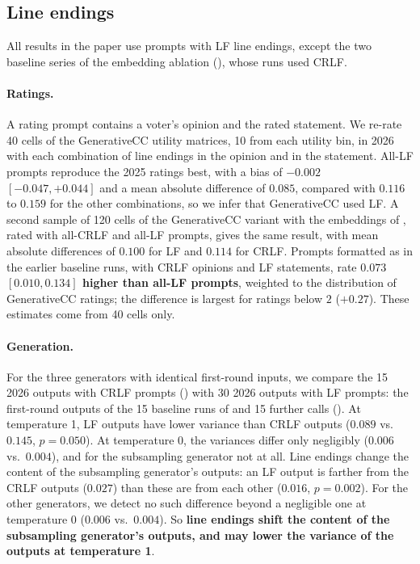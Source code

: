 \documentclass[letterpaper]{article} %
\begin{document}
\subsection{Line endings}
\label{app:line-endings}

All results in the paper use prompts with LF line endings, except the two baseline series of the embedding ablation (), whose runs used CRLF.

\paragraph{Ratings.}
A rating prompt contains a voter's opinion and the rated statement.
We re-rate 40 cells of the GenerativeCC utility matrices, 10 from each utility bin, in 2026 with each combination of line endings in the opinion and in the statement.
All-LF prompts reproduce the 2025 ratings best, with a bias of \(-0.002\) \([-0.047, +0.044]\) and a mean absolute difference of \(0.085\), compared with \(0.116\) to \(0.159\) for the other combinations, so we infer that GenerativeCC used LF.
A second sample of 120 cells of the GenerativeCC variant with the embeddings of \citet{fish-v2}, rated with all-CRLF and all-LF prompts, gives the same result, with mean absolute differences of \(0.100\) for LF and \(0.114\) for CRLF.
Prompts formatted as in the earlier baseline runs, with CRLF opinions and LF statements, rate \textbf{\(0.073\) \([0.010, 0.134]\) higher than all-LF prompts}, weighted to the distribution of GenerativeCC ratings; the difference is largest for ratings below \(2\) (\(+0.27\)).
These estimates come from 40 cells only.

\paragraph{Generation.}
For the three generators with identical first-round inputs, we compare the 15 2026 outputs with CRLF prompts () with 30 2026 outputs with LF prompts: the first-round outputs of the 15 baseline runs of  and 15 further calls ().
At temperature 1, LF outputs have lower variance than CRLF outputs (\(0.089\) vs.\ \(0.145\), \(p = 0.050\)).
At temperature 0, the variances differ only negligibly (\(0.006\) vs.\ \(0.004\)), and for the subsampling generator not at all.
Line endings change the content of the subsampling generator's outputs: an LF output is farther from the CRLF outputs (\(0.027\)) than these are from each other (\(0.016\), \(p = 0.002\)).
For the other generators, we detect no such difference beyond a negligible one at temperature 0 (\(0.006\) vs.\ \(0.004\)).
So \textbf{line endings shift the content of the subsampling generator's outputs, and may lower the variance of the outputs at temperature 1}.
\end{document}
